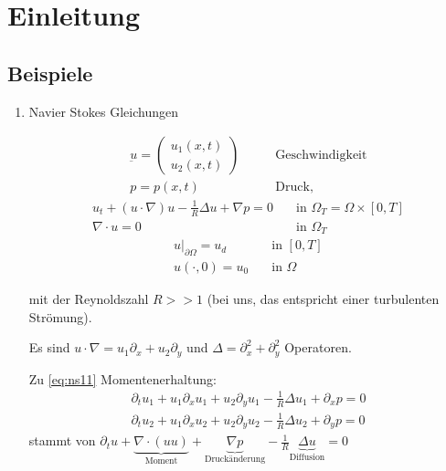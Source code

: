 
\section{Einleitung}
\label{sec:einleitung}

\subsection{Beispiele}
\label{sec:beispiele}

\begin{enumerate}
\item Navier Stokes Gleichungen

  \begin{align*}
    \underbar u =
    \begin{pmatrix}
      u_{1}(x, t)\\
      u_{2}(x, t)
    \end{pmatrix} \qquad &\text{Geschwindigkeit}\\
p = p(x, t) \qquad &\text{Druck}, 
  \end{align*}
  \begin{subequations}
\label{eq:ns1}
  \begin{align}
    u_{t} + (u\cdot \nabla)u - \frac 1 R \Delta u + \nabla p = 0\quad &\text{in } \Omega_{T} = \Omega \times [0, T] \label{eq:ns11}\\
\nabla\cdot u = 0 \quad &\text{in } \Omega_{T} \label{eq:ns12}
  \end{align}
  \end{subequations}
  \begin{subequations}
    \label{eq:ns2}
    \begin{align}
      u|_{\partial \Omega} = u_{d} \quad &\text{in } [0, T]\label{eq:ns_rb}\\
      u(\cdot, 0)= u_{0} \quad &\text{in } \Omega \label{eq:ns_ab}
    \end{align}
  \end{subequations}

mit der Reynoldszahl $R >> 1$ (bei uns, das entspricht einer turbulenten Strömung). 

Es sind $u\cdot \nabla = u_{1}\partial_{x} + u_{2} \partial_{y}$ und $\Delta = \partial_{x}^{2} + \partial_{y}^{2} $ Operatoren. 

Zu \eqref{eq:ns11} Momentenerhaltung:
\begin{align*}
  \partial_{t}u_{1} + u_{1}\partial_{x}u_{1} + u_{2}\partial_{y}u_{1} -\frac 1 R \Delta u_{1} + \partial_{x} p = 0\\ 
  \partial_{t}u_{2} + u_{1}\partial_{x}u_{2} + u_{2}\partial_{y}u_{2} -\frac 1 R \Delta u_{2} + \partial_{y} p = 0
\end{align*}
stammt von $\partial_{t} u + \underbrace{\nabla\cdot(uu)}_{\text{Moment}} + \underbrace{\nabla p}_{\text{Druckänderung}}-\frac 1 R  \underbrace{\Delta u}_{\text{Diffusion}}  = 0$


\end{enumerate}
